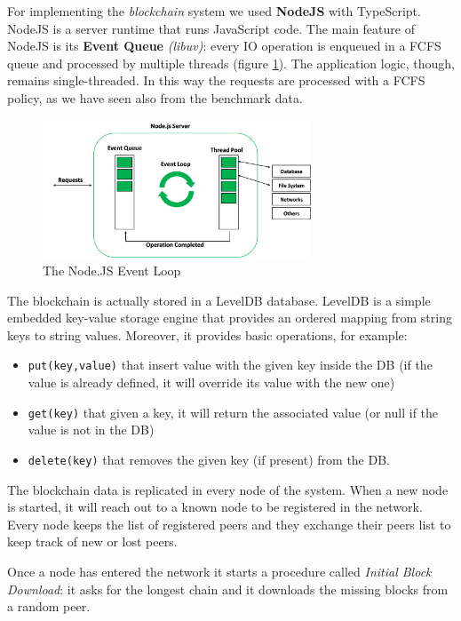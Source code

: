 \documentclass[11pt]{scrartcl} %
\begin{document}
For implementing the \textit{blockchain} system we used \textbf{NodeJS} with TypeScript. NodeJS is a server runtime that runs JavaScript code. The main feature of NodeJS is its \textbf{Event Queue} \textit{(libuv)}: every IO operation is enqueued in a FCFS queue and processed by multiple threads (figure \ref{fig:eventloop}). The application logic, though, remains single-threaded. In this way the requests are processed with a FCFS policy, as we have seen also from the benchmark data.

\begin{figure}[h]
\includegraphics[width=8cm]{Images/eventloop.png}
\centering
\caption{The Node.JS Event Loop}
\label{fig:eventloop}
\end{figure}



The blockchain is actually stored in a LevelDB database. LevelDB is a simple embedded key-value storage engine that provides an ordered mapping from string keys to string values. Moreover, it provides basic operations, for example:
\begin{itemize}
\item[\adforn{43}] \texttt{put(key,value)} that insert value with the given key inside the DB (if the value is already defined, it will override its value with the new one)
\item[\adforn{43}] \texttt{get(key)} that given a key, it will return the associated value (or null if the value is not in the DB)
\item[\adforn{43}] \texttt{delete(key)} that removes the given key (if present) from  the DB.
\end{itemize}

The blockchain data is replicated in every node of the system. When a new node is started, it will reach out to a known node to be registered in the network. Every node keeps the list of registered peers and they exchange their peers list to keep track of new or lost peers.

Once a node has entered the network it starts a procedure called \textit{Initial Block Download}: it asks for the longest chain and it downloads the missing blocks from a random peer.
\end{document}
